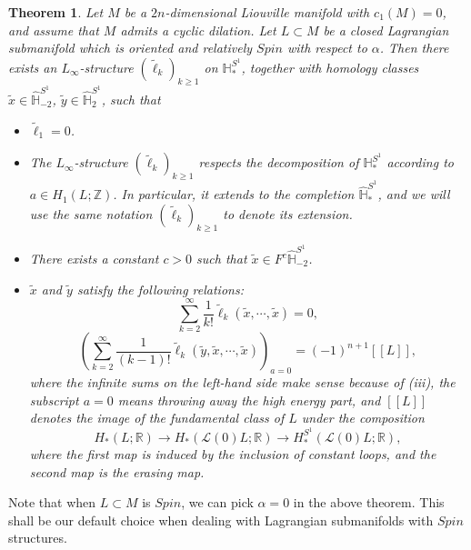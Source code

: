 \documentclass[a4paper]{article}
\newtheorem{theorem}{Theorem}
\numberwithin{equation}{section}
\begin{document}
\begin{theorem}\label{theorem:main}
Let $M$ be a $2n$-dimensional Liouville manifold with $c_1(M)=0$, and assume that $M$ admits a cyclic dilation. Let $L\subset M$ be a closed Lagrangian submanifold which is oriented and relatively $\mathit{Spin}$ with respect to $\alpha$. Then there exists an $L_\infty$-structure $(\tilde{\ell}_k)_{k\geq1}$ on $\mathbb{H}_\ast^{S^1}$, together with homology classes $\tilde{x}\in\widehat{\mathbb{H}}_{-2}^{S^1}$, $\tilde{y}\in\widehat{\mathbb{H}}_2^{S^1}$, such that
\begin{itemize}
	\item[(i)] $\tilde{\ell}_1=0$.
	\item[(ii)] The $L_\infty$-structure $(\tilde{\ell}_k)_{k\geq1}$ respects the decomposition of $\mathbb{H}_\ast^{S^1}$ according to $a\in H_1(L;\mathbb{Z})$. In particular, it extends to the completion $\widehat{\mathbb{H}}_\ast^{S^1}$, and we will use the same notation $(\tilde{\ell}_k)_{k\geq1}$ to denote its extension.
	\item[(iii)] There exists a constant $c>0$ such that $\tilde{x}\in F^c\widehat{\mathbb{H}}_{-2}^{S^1}$.
	\item[(iv)] $\tilde{x}$ and $\tilde{y}$ satisfy the following relations:
	\begin{equation}
	\sum_{k=2}^\infty\frac{1}{k!}\tilde{\ell}_k(\tilde{x},\cdots,\tilde{x})=0,
	\end{equation}
    \begin{equation}\label{eq:def1}
    \left(\sum_{k=2}^\infty\frac{1}{(k-1)!}\tilde{\ell}_k(\tilde{y},\tilde{x},\cdots,\tilde{x})\right)_{a=0}=(-1)^{n+1}[\![L]\!],
    \end{equation}
    where the infinite sums on the left-hand side make sense because of (iii), the subscript $a=0$ means throwing away the high energy part, and $[\![L]\!]$ denotes the image of the fundamental class of $L$ under the composition
    \begin{equation}
    H_\ast(L;\mathbb{R})\rightarrow H_\ast(\mathcal{L}(0)L;\mathbb{R})\rightarrow H_\ast^{S^1}(\mathcal{L}(0)L;\mathbb{R}),
    \end{equation}
    where the first map is induced by the inclusion of constant loops, and the second map is the erasing map.
\end{itemize}
\end{theorem}

Note that when $L\subset M$ is $\mathit{Spin}$, we can pick $\alpha=0$ in the above theorem. This shall be our default choice when dealing with Lagrangian submanifolds with $\mathit{Spin}$ structures.
\end{document}
